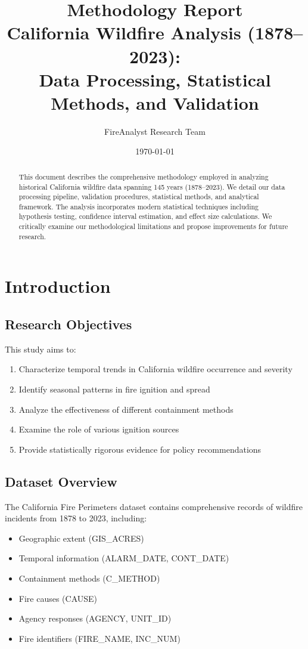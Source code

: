 \documentclass[12pt,a4paper]{article}
\title{\textbf{Methodology Report} \\
\large California Wildfire Analysis (1878--2023): \\
Data Processing, Statistical Methods, and Validation}
\author{FireAnalyst Research Team}
\date{\today}
\begin{document}
\maketitle

\begin{abstract}
This document describes the comprehensive methodology employed in analyzing historical California wildfire data spanning 145 years (1878--2023). We detail our data processing pipeline, validation procedures, statistical methods, and analytical framework. The analysis incorporates modern statistical techniques including hypothesis testing, confidence interval estimation, and effect size calculations. We critically examine our methodological limitations and propose improvements for future research.
\end{abstract}

\tableofcontents
\newpage

\section{Introduction}

\subsection{Research Objectives}

This study aims to:
\begin{enumerate}
    \item Characterize temporal trends in California wildfire occurrence and severity
    \item Identify seasonal patterns in fire ignition and spread
    \item Analyze the effectiveness of different containment methods
    \item Examine the role of various ignition sources
    \item Provide statistically rigorous evidence for policy recommendations
\end{enumerate}

\subsection{Dataset Overview}

The California Fire Perimeters dataset contains comprehensive records of wildfire incidents from 1878 to 2023, including:

\begin{itemize}
    \item Geographic extent (GIS\_ACRES)
    \item Temporal information (ALARM\_DATE, CONT\_DATE)
    \item Containment methods (C\_METHOD)
    \item Fire causes (CAUSE)
    \item Agency responses (AGENCY, UNIT\_ID)
    \item Fire identifiers (FIRE\_NAME, INC\_NUM)
\end{itemize}
\end{document}
